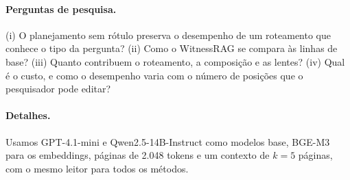 \documentclass[11pt]{article}
\begin{document}
\paragraph{Perguntas de pesquisa.} (i) O planejamento sem rótulo preserva o
desempenho de um roteamento que conhece o tipo da pergunta? (ii) Como o
WitnessRAG se compara às linhas de base? (iii) Quanto contribuem o
roteamento, a composição e as lentes? (iv) Qual é o custo, e como o
desempenho varia com o número de posições que o pesquisador pode editar?

\paragraph{Detalhes.} Usamos GPT-4.1-mini e Qwen2.5-14B-Instruct como modelos
base, BGE-M3 para os embeddings, páginas de 2.048 tokens e um contexto de
$k=5$ páginas, com o mesmo leitor para todos os métodos.
\end{document}
